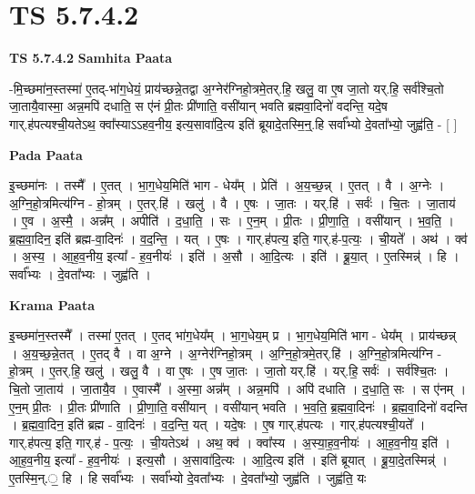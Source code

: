 \documentclass[17pt]{extarticle}
\begin{document}
\section{ TS 5.7.4.2 }

\textbf{TS 5.7.4.2 } \newline
\textbf{Samhita Paata} \newline

-मि॒च्छमा॑न॒स्तस्मा॑ ए॒तद्-भा॑ग॒धेयं॒ प्राय॑च्छन्ने॒तद्वा अ॒ग्नेर॑ग्निहो॒त्रमे॒तर्.हि॒ खलु॒ वा ए॒ष जा॒तो यर्.हि॒ सर्व॑श्चि॒तो जा॒तायै॒वास्मा॒ अन्न॒मपि॑ दधाति॒ स ए॑नं प्री॒तः प्री॑णाति॒ वसी॑यान् भवति ब्रह्मवा॒दिनो॑ वदन्ति॒ यदे॒ष गार्.ह॑पत्यश्ची॒यतेऽथ॒ क्वा᳚स्याऽऽहव॒नीय॒ इत्य॒सावा॑दि॒त्य इति॑ ब्रूयादे॒तस्मि॒न्॒.हि सर्वा᳚भ्यो दे॒वता᳚भ्यो॒ जुह्व॑ति॒ - [  ] \newline

\textbf{Pada Paata} \newline

इ॒च्छमा॑नः । तस्मै᳚ । ए॒तत् । भा॒ग॒धेय॒मिति॑ भाग - धेय᳚म् । प्रेति॑ । अ॒य॒च्छ॒न्न् । ए॒तत् । वै । अ॒ग्नेः । अ॒ग्नि॒हो॒त्रमित्य॑ग्नि - हो॒त्रम् । ए॒तर्.हि॑ । खलु॑ । वै । ए॒षः । जा॒तः । यर्.हि॑ । सर्वः॑ । चि॒तः । जा॒ताय॑ । ए॒व । अ॒स्मै॒ । अन्न᳚म् । अपीति॑ । द॒धा॒ति॒ । सः । ए॒न॒म् । प्री॒तः । प्री॒णा॒ति॒ । वसी॑यान् । भ॒व॒ति॒ । ब्र॒ह्म॒वा॒दिन॒ इति॑ ब्रह्म-वा॒दिनः॑ । व॒द॒न्ति॒ । यत् । ए॒षः । गार्.ह॑पत्य॒ इति॒ गार्.ह॑-प॒त्यः॒ । ची॒यते᳚ । अथ॑ । क्व॑ । अ॒स्य॒ । आ॒ह॒व॒नीय॒ इत्या᳚ -   ह॒व॒नीयः॑ । इति॑ । अ॒सौ । आ॒दि॒त्यः । इति॑ । ब्रू॒या॒त् । ए॒तस्मिन्न्॑ । हि । सर्वा᳚भ्यः । दे॒वता᳚भ्यः । जुह्व॑ति ।  \newline


\textbf{Krama Paata} \newline

इ॒च्छमा॑न॒स्तस्मै᳚ । तस्मा॑ ए॒तत् । ए॒तद् भा॑ग॒धेय᳚म् । भा॒ग॒धेय॒म् प्र । भा॒ग॒धेय॒मिति॑ भाग - धेय᳚म् । प्राय॑च्छन्न् । अ॒य॒च्छ॒न्ने॒तत् । ए॒तद् वै । वा अ॒ग्ने । अ॒ग्नेर॑ग्निहो॒त्रम् । अ॒ग्नि॒हो॒त्रमे॒तर्.हि॑ । अ॒ग्नि॒हो॒त्रमित्य॑ग्नि - हो॒त्रम् । ए॒तर्.हि॒ खलु॑ । खलु॒ वै । वा ए॒षः । ए॒ष जा॒तः । जा॒तो यर्.हि॑ । यर्.हि॒ सर्वः॑ । सर्व॑श्चि॒तः । चि॒तो जा॒ताय॑ । जा॒तायै॒व । ए॒वास्मै᳚ । अ॒स्मा॒ अन्न᳚म् । अन्न॒मपि॑ । अपि॑ दधाति । द॒धा॒ति॒ सः । स ए॑नम् । ए॒न॒म् प्री॒तः । प्री॒तः प्री॑णाति । प्री॒णा॒ति॒ वसी॑यान् । वसी॑यान् भवति । भ॒व॒ति॒ ब्र॒ह्म॒वा॒दिनः॑ । ब्र॒ह्म॒वा॒दिनो॑ वदन्ति । ब्र॒ह्म॒वा॒दिन॒ इति॑ ब्रह्म - वा॒दिनः॑ । व॒द॒न्ति॒ यत् । यदे॒षः । ए॒ष गार्.ह॑पत्यः । गार्.ह॑पत्यश्ची॒यते᳚ । गार्.ह॑पत्य॒ इति॒ गार्.ह॑ - प॒त्यः॒ । ची॒यतेऽथ॑ । अथ॒ क्व॑ । क्वा᳚स्य । अ॒स्या॒ह॒व॒नीयः॑ । आ॒ह॒व॒नीय॒ इति॑ । आ॒ह॒व॒नीय॒ इत्या᳚ - ह॒व॒नीयः॑ । इत्य॒सौ । अ॒सावा॑दि॒त्यः । आ॒दि॒त्य इति॑ । इति॑ ब्रूयात् । ब्रू॒या॒दे॒तस्मिन्न्॑ । ए॒तस्मि॒न्.॒ हि । हि सर्वा᳚भ्यः । सर्वा᳚भ्यो दे॒वता᳚भ्यः । दे॒वता᳚भ्यो॒ जुह्व॑ति । जुह्व॑ति॒ यः \newline
\end{document}
